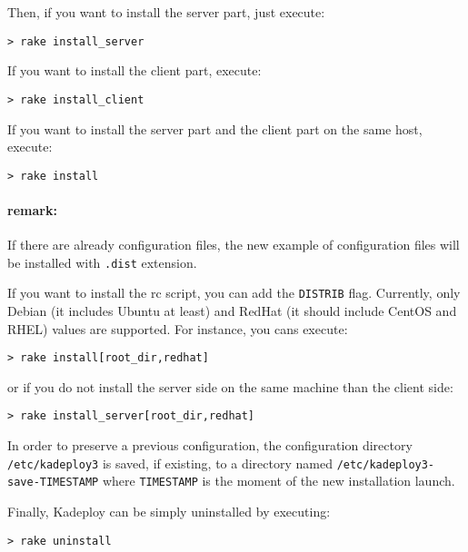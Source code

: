 \documentclass[a4wide,10pt,oneside]{book}
\begin{document}
\noindent Then, if you want to install the server part, just execute:
\begin{small}
\begin{verbatim}
> rake install_server
\end{verbatim}
\end{small}

\noindent If you want to install the client part, execute:
\begin{small}
\begin{verbatim}
> rake install_client
\end{verbatim}
\end{small}

\noindent If you want to install the server part and the client part on the same host, execute:
\begin{small}
\begin{verbatim}
> rake install
\end{verbatim}
\end{small}

\paragraph{remark:} If there are already configuration files, the new example of configuration files will be installed with \texttt{.dist} extension.

\noindent If you want to install the rc script, you can add the \texttt{DISTRIB} flag. Currently, only Debian (it includes Ubuntu at least) and RedHat (it should include CentOS and RHEL) values are supported. For instance, you cans execute:
\begin{small}
\begin{verbatim}
> rake install[root_dir,redhat]
\end{verbatim}
\end{small}
or if you do not install the server side on the same machine than the client side:
\begin{small}
\begin{verbatim}
> rake install_server[root_dir,redhat]
\end{verbatim}
\end{small}

\noindent In order to preserve a previous configuration, the configuration directory \texttt{/etc/kadeploy3} is saved, if existing, to a directory named \texttt{/etc/kadeploy3-save-TIMESTAMP} where \texttt{TIMESTAMP} is the moment of the new installation launch.

\noindent Finally, Kadeploy can be simply uninstalled by executing:
\begin{small}
\begin{verbatim}
> rake uninstall
\end{verbatim}
\end{small}
\end{document}
